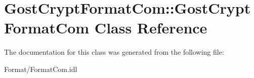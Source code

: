 \hypertarget{class_gost_crypt_format_com_1_1_gost_crypt_format_com}{}\section{Gost\+Crypt\+Format\+Com\+:\+:Gost\+Crypt\+Format\+Com Class Reference}
\label{class_gost_crypt_format_com_1_1_gost_crypt_format_com}


The documentation for this class was generated from the following file\+:\begin{DoxyCompactItemize}
\item 
Format/Format\+Com.\+idl\end{DoxyCompactItemize}
